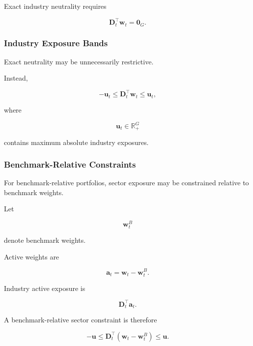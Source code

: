\documentclass[11pt,a4paper]{article}
\begin{document}
Exact industry neutrality requires

\begin{equation}
\boxed{
\mathbf{D}_t^\top
\mathbf{w}_t
=
\mathbf{0}_{G}.
}
\end{equation}


\subsubsection{Industry Exposure Bands}

Exact neutrality may be unnecessarily restrictive.

Instead,

\begin{equation}
-\mathbf{u}_t
\leq
\mathbf{D}_t^\top
\mathbf{w}_t
\leq
\mathbf{u}_t,
\end{equation}

where

\begin{equation}
\mathbf{u}_t
\in
\mathbb{R}_{+}^{G}
\end{equation}

contains maximum absolute industry exposures.


\subsubsection{Benchmark-Relative Constraints}

For benchmark-relative portfolios, sector exposure may be constrained relative
to benchmark weights.

Let

\begin{equation}
\mathbf{w}_t^{B}
\end{equation}

denote benchmark weights.

Active weights are

\begin{equation}
\mathbf{a}_t
=
\mathbf{w}_t
-
\mathbf{w}_t^{B}.
\end{equation}

Industry active exposure is

\begin{equation}
\boxed{
\mathbf{D}_t^\top
\mathbf{a}_t.
}
\end{equation}

A benchmark-relative sector constraint is therefore

\begin{equation}
-\mathbf{u}
\leq
\mathbf{D}_t^\top
\left(
\mathbf{w}_t-\mathbf{w}_t^{B}
\right)
\leq
\mathbf{u}.
\end{equation}
\end{document}
